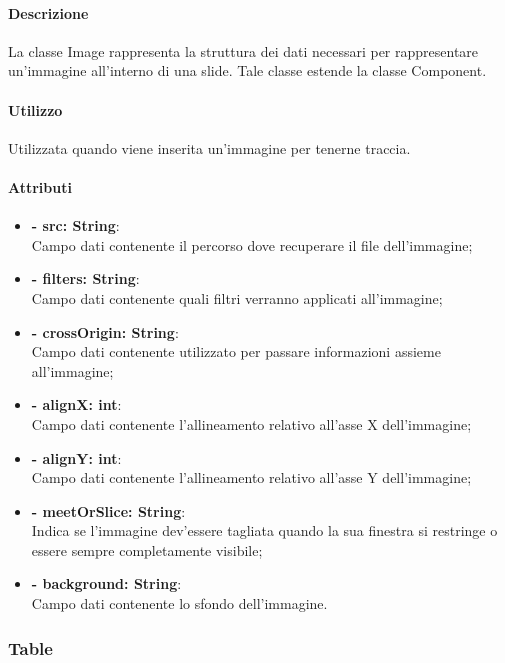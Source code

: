 	\paragraph{Descrizione}
	La classe Image rappresenta la struttura dei dati necessari per rappresentare un'immagine all'interno di una \gls{slide}. Tale classe estende la classe Component.
	
	\paragraph{Utilizzo}
	Utilizzata quando viene inserita un'immagine per tenerne traccia.
	
	\paragraph{Attributi}
	\begin{itemize}
		\item \textbf{- src: String}:\\
			Campo dati contenente il percorso dove recuperare il file dell'immagine;
		\item \textbf{- filters: String}:\\
			Campo dati contenente quali filtri verranno applicati all'immagine;
		\item \textbf{- crossOrigin: String}:\\
			Campo dati contenente utilizzato per passare informazioni assieme all'immagine;
		\item \textbf{- alignX: int}:\\
			Campo dati contenente l'allineamento relativo all'asse X dell'immagine;
		\item \textbf{- alignY: int}:\\
			Campo dati contenente l'allineamento relativo all'asse Y dell'immagine;
		\item \textbf{- meetOrSlice: String}:\\
			Indica se l'immagine dev'essere tagliata quando la sua finestra si restringe o essere sempre completamente visibile;
		\item \textbf{- background: String}:\\
			Campo dati contenente lo sfondo dell'immagine.
	\end{itemize}
	
	
\newpage


\subsubsection{Table}

